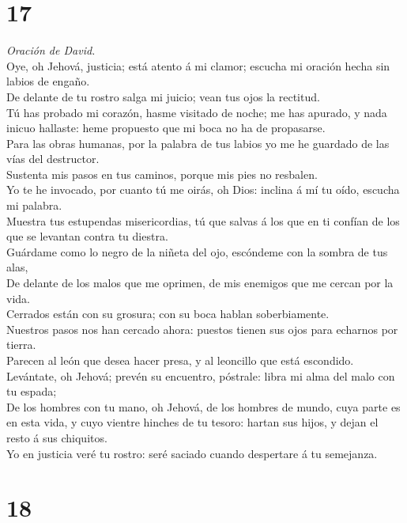 \hypertarget{section-16}{%
\section{17}\label{section-16}}

 \emph{Oración de David.}\\
Oye, oh Jehová, justicia; está atento á mi clamor; escucha mi oración
hecha sin labios de engaño.\\
 De delante de tu rostro salga mi juicio; vean tus ojos la
rectitud.\\
 Tú has probado mi corazón, hasme visitado de noche; me has
apurado, y nada inicuo hallaste: heme propuesto que mi boca no ha de
propasarse.\\
 Para las obras humanas, por la palabra de tus labios yo me
he guardado de las vías del destructor.\\
 Sustenta mis pasos en tus caminos, porque mis pies no
resbalen.\\
 Yo te he invocado, por cuanto tú me oirás, oh Dios: inclina
á mí tu oído, escucha mi palabra.\\
 Muestra tus estupendas misericordias, tú que salvas á los
que en ti confían de los que se levantan contra tu diestra.\\
 Guárdame como lo negro de la niñeta del ojo, escóndeme con
la sombra de tus alas,\\
 De delante de los malos que me oprimen, de mis enemigos que
me cercan por la vida.\\
 Cerrados están con su grosura; con su boca hablan
soberbiamente.\\
 Nuestros pasos nos han cercado ahora: puestos tienen sus
ojos para echarnos por tierra.\\
 Parecen al león que desea hacer presa, y al leoncillo que
está escondido.\\
 Levántate, oh Jehová; prevén su encuentro, póstrale: libra
mi alma del malo con tu espada;\\
 De los hombres con tu mano, oh Jehová, de los hombres de
mundo, cuya parte es en esta vida, y cuyo vientre hinches de tu tesoro:
hartan sus hijos, y dejan el resto á sus chiquitos.\\
 Yo en justicia veré tu rostro: seré saciado cuando
despertare á tu semejanza.

\hypertarget{section-17}{%
\section{18}\label{section-17}}

